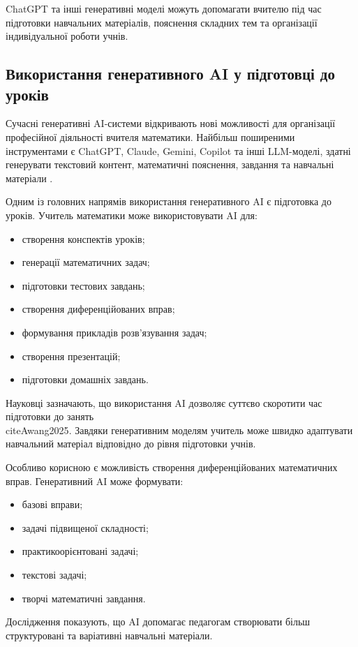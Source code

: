 ChatGPT та інші генеративні моделі можуть допомагати вчителю під час підготовки навчальних матеріалів, пояснення складних тем та організації індивідуальної роботи учнів.


\subsection{Використання генеративного AI у підготовці до уроків}

Сучасні генеративні AI-системи відкривають нові можливості для організації професійної діяльності вчителя математики. Найбільш поширеними інструментами є ChatGPT, Claude, Gemini, Copilot та інші LLM-моделі, здатні генерувати текстовий контент, математичні пояснення, завдання та навчальні матеріали \cite{Walkington2025,Kock2025192}.

Одним із головних напрямів використання генеративного AI є підготовка до уроків. Учитель математики може використовувати AI для:
\begin{itemize}
\item створення конспектів уроків;
\item генерації математичних задач;
\item підготовки тестових завдань;
\item створення диференційованих вправ;
\item формування прикладів розв’язування задач;
\item створення презентацій;
\item підготовки домашніх завдань.
\end{itemize}

Науковці зазначають, що використання AI дозволяє суттєво скоротити час підготовки до занять \\cite{Awang2025}. Завдяки генеративним моделям учитель може швидко адаптувати навчальний матеріал відповідно до рівня підготовки учнів.

Особливо корисною є можливість створення диференційованих математичних вправ. Генеративний AI може формувати:
\begin{itemize}
\item базові вправи;
\item задачі підвищеної складності;
\item практикоорієнтовані задачі;
\item текстові задачі;
\item творчі математичні завдання.
\end{itemize}

Дослідження \cite{Awang2025} показують, що AI допомагає педагогам створювати більш структуровані та варіативні навчальні матеріали.

